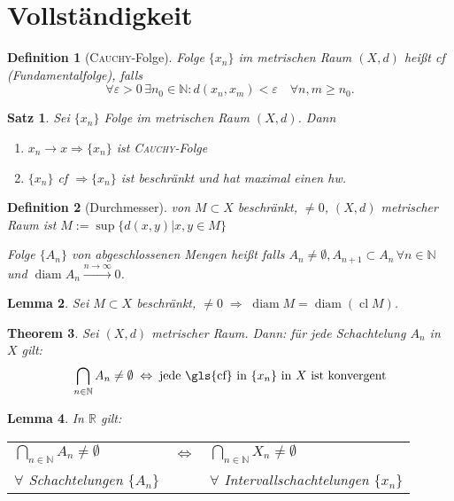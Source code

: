 \documentclass[ngerman,a4paper]{report}
\theoremstyle{break}
\newtheorem{theorem}{Theorem}[section]
\newtheorem{lemma}[theorem]{Lemma}
\newtheorem{satz}[theorem]{Satz}
\newtheorem*{definition}{Definition}
\newcommand{\person}[1]{\textsc{#1}}
\renewcommand{\epsilon}{\varepsilon}
\DeclareMathOperator{\cl}{cl}
\DeclareMathOperator{\diam}{diam}
\begin{document}
\section{Vollständigkeit}
\begin{definition}[\person{Cauchy}-Folge]
	Folge $\{x_n\}$ im metrischen Raum $(X,d)$ heißt \gls{cf} (Fundamentalfolge), falls
    \[
    \forall\epsilon > 0 \,\exists n_0\in\mathbb{N}: d(x_n, x_m) < \epsilon\quad\forall n,m\ge n_0.
    \]
\end{definition}
\begin{satz}
	Sei $\{x_n\}$ Folge im metrischen Raum $(X,d)$. Dann
	\begin{enumerate}[label={\arabic*)}]
		\item $x_n\rightarrow x \Rightarrow \{x_n\}$ ist \person{Cauchy}-Folge
		\item $\{x_n\}$ \gls{cf} $\Rightarrow \{x_n\}$ ist beschränkt und hat maximal einen \gls{hw}.
	\end{enumerate}
\end{satz}
\begin{definition}[Durchmesser]
	 von $M\subset X$ beschränkt, $\neq 0$, $(X,d)$ metrischer Raum ist \mathsymbol{diam}{$\diam$}$M:=\sup\{d(x,y) | x,y\in M\}$
	
	Folge $\{A_n\}$ von abgeschlossenen Mengen heißt  falls $A_n\neq\emptyset, A_{n+1}\subset A_n\,\forall n\in\mathbb{N}$ und $\diam A_n\overset{n\rightarrow\infty}{\longrightarrow}0$.
\end{definition}
\begin{lemma}
	Sei $M\subset X$ beschränkt, $\neq 0\;\Rightarrow\;\diam M = \diam (\cl M)$.
\end{lemma}
\begin{theorem}
	Sei $(X,d)$ metrischer Raum. Dann: für jede Schachtelung $A_n$ in $X$ gilt:\[ \bigcap_{n\in\mathbb{N}} A_n\neq \emptyset \;\Leftrightarrow \; \text{jede \gls{cf} in $\{x_n\}$ in $X$ ist konvergent} \]
\end{theorem}
\begin{lemma}
	In $\mathbb{R}$ gilt:
	\begin{center}
		\begin{tabular}{lcl}
			$\bigcap_{n\in\mathbb{N}} A_n\neq \emptyset$ & $\Leftrightarrow$ & $\bigcap_{n\in\mathbb{N}} X_n\neq \emptyset$ \\[5pt]
			$\forall$ Schachtelungen $\{A_n\}$ && $\forall$ Intervallschachtelungen $\{x_n\}$
		\end{tabular}
	\end{center}
\end{lemma}
\end{document}
